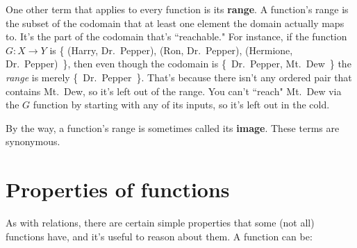 One other term that applies to every function is its \textbf{range}. A
function's range is the subset of the codomain that at least one element
the domain actually maps to. It's the part of the codomain that's
``reachable." For instance, if the function $G : X \rightarrow Y$ is \{
(Harry, Dr.~Pepper), (Ron, Dr.~Pepper), (Hermione, Dr.~Pepper)~\}, then
even though the codomain is \{~Dr.~Pepper, Mt.~Dew~\} the \textit{range} is
merely \{~Dr.~Pepper~\}.  That's because there isn't any ordered pair that
contains Mt.~Dew, so it's left out of the range. You can't ``reach" Mt.~Dew
via the $G$ function by starting with any of its inputs, so it's left out
in the cold.

By the way, a function's range is sometimes called its \textbf{image}.
These terms are synonymous.


\section{Properties of functions}

As with relations, there are certain simple properties that some (not all)
functions have, and it's useful to reason about them. A function can be:

